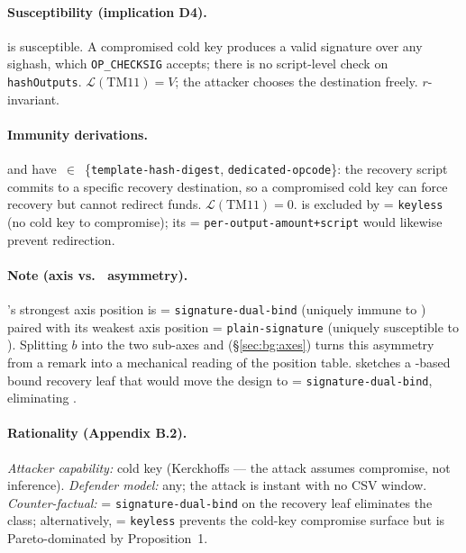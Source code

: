 \paragraph{Susceptibility (implication D4).} \catcsfs{} is
susceptible. A compromised cold key produces a valid signature over
any sighash, which \texttt{OP\_CHECKSIG} accepts; there is no
script-level check on \texttt{hashOutputs}.
$\mathcal{L}(\mathrm{TM11}) = V$; the attacker chooses the
destination freely. $r$-invariant.

\paragraph{Immunity derivations.} \opctv{} and \opvault{} have
\axrecbind{} \,$\in$\, \{\texttt{template-hash-digest},
\texttt{dedicated-opcode}\}: the recovery script commits to a
specific recovery destination, so a compromised cold key can force
recovery but cannot redirect funds.
$\mathcal{L}(\mathrm{TM11}) = 0$. \opccv{} is excluded by
\axauth{} = \texttt{keyless} (no cold key to compromise); its
\axrecbind{} = \texttt{per-output-amount+script} would likewise
prevent redirection.

\paragraph{Note (axis \axwdbind{} vs.\ \axrecbind{} asymmetry).}
\catcsfs{}'s strongest axis position is \axwdbind{} =
\texttt{signature-dual-bind} (uniquely immune to \classhot{}) paired
with its weakest axis position \axrecbind{} = \texttt{plain-signature}
(uniquely susceptible to \classcold{}). Splitting $b$ into the two
sub-axes \axwdbind{} and \axrecbind{} (§\ref{sec:bg:axes}) turns
this asymmetry from a remark into a mechanical reading of the
position table. \cite{Poe21} sketches a \catcsfs{}-based bound
recovery leaf that would move the design to \axrecbind{} =
\texttt{signature-dual-bind}, eliminating \classcold{}.

\paragraph{Rationality (Appendix B.2).} \emph{Attacker capability:}
cold key (Kerckhoffs --- the attack assumes compromise, not
inference). \emph{Defender model:} any; the attack is instant with no
CSV window. \emph{Counter-factual:} \axrecbind{} =
\texttt{signature-dual-bind} on the recovery leaf eliminates the
class; alternatively, \axauth{} = \texttt{keyless} prevents the
cold-key compromise surface but is Pareto-dominated by Proposition~1.


